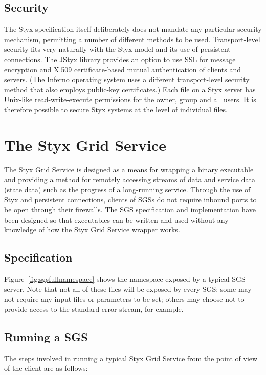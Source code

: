 \documentclass[a4paper]{article}
\begin{document}
\begin{multicols}{2}
\subsection{Security} \label{sec:security}
The Styx specification itself deliberately does not mandate any particular security mechanism, permitting a number of different methods to be used.  Transport-level security fits very naturally with the Styx model and its use of persistent connections.  The JStyx library provides an option to use SSL for message encryption and X.509 certificate-based mutual authentication of clients and servers.  (The Inferno operating system uses a different transport-level security method that also employs public-key certificates.)  Each file on a Styx server has Unix-like read-write-execute permissions for the owner, group and all users.  It is therefore possible to secure Styx systems at the level of individual files.

\section{The Styx Grid Service}
The Styx Grid Service is designed as a means for wrapping a binary executable and providing a method for remotely accessing streams of data and service data (state data) such as the progress of a long-running service.  Through the use of Styx and persistent connections, clients of SGSs do not require inbound ports to be open through their firewalls.  The SGS specification and implementation have been designed so that executables can be written and used without any knowledge of how the Styx Grid Service wrapper works.

\subsection{Specification}
Figure~\ref{fig:sgsfullnamespace} shows the namespace exposed by a typical SGS server.  Note that not all of these files will be exposed by every SGS: some may not require any input files or parameters to be set; others may choose not to provide access to the standard error stream, for example.

\subsection{Running a SGS} \label{sec:runningsgs}
The steps involved in running a typical Styx Grid Service from the point of view of the client are as follows:


\end{multicols}
\end{document}
